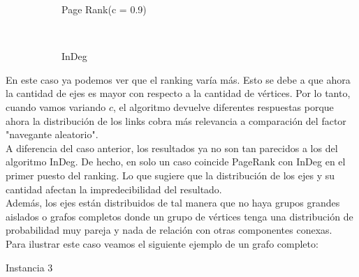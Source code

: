 \begin{figure}[H]
    \centering
    \begin{subfigure}[t]{0.5\textwidth}
      \begin{center}
        Page Rank(c = 0.9)\\
      \end{center}
    \end{subfigure}%
    ~
    \begin{subfigure}[t]{0.5\textwidth}
      \begin{center}
        InDeg\\
      \end{center}
    \end{subfigure}
\end{figure}

En este caso ya podemos ver que el ranking varía más. Esto se debe a que ahora la cantidad de ejes es mayor con respecto a la cantidad de vértices. Por lo tanto, cuando vamos variando $c$, el algoritmo devuelve diferentes respuestas porque ahora la distribución de los links cobra más relevancia a comparación del factor "navegante aleatorio".\\
A diferencia del caso anterior, los resultados ya no son tan parecidos a los del algoritmo InDeg. De hecho, en solo un caso coincide PageRank con InDeg en el primer puesto del ranking. Lo que sugiere que la distribución de los ejes y su cantidad afectan la impredecibilidad del resultado.\\
Además, los ejes están distribuidos de tal manera que no haya grupos grandes aislados o grafos completos donde un grupo de vértices tenga una distribución de probabilidad muy pareja y nada de relación con otras componentes conexas.\\
Para ilustrar este caso veamos el siguiente ejemplo de un grafo completo:

\begin{center}
Instancia 3
\end{center}

